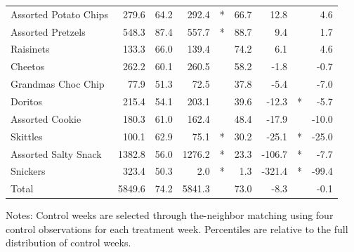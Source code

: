 \documentclass[aspectratio=169,11pt]{beamer}
\begin{document}
\begin{frame}
\begin{table}
\begin{center}
\begin{tabular}{|l|rrrcrrcr|}
Assorted Potato Chips&279.6&64.2&292.4&\hspace{-0.3in}*&66.7&12.8& \hspace{-0.3in}&4.6\\
Assorted Pretzels&548.3&87.4&557.7&\hspace{-0.3in}*&88.7&9.4& \hspace{-0.3in}&1.7\\
Raisinets&133.3&66.0&139.4& \hspace{-0.3in}&74.2&6.1& \hspace{-0.3in}&4.6\\
Cheetos&262.2&60.1&260.5& \hspace{-0.3in}&58.2&-1.8& \hspace{-0.3in}&-0.7\\
Grandmas Choc Chip&77.9&51.3&72.5& \hspace{-0.3in}&37.8&-5.4& \hspace{-0.3in}&-7.0\\
Doritos&215.4&54.1&203.1& \hspace{-0.3in}&39.6&-12.3& \hspace{-0.3in}*&-5.7\\
Assorted Cookie&180.3&61.0&162.4& \hspace{-0.3in}&48.4&-17.9& \hspace{-0.3in}&-10.0\\
Skittles&100.1&62.9&75.1&\hspace{-0.3in}*&30.2&-25.1& \hspace{-0.3in}*&-25.0\\
Assorted Salty Snack&1382.8&56.0&1276.2&\hspace{-0.3in}*&23.3&-106.7& \hspace{-0.3in}*&-7.7\\
Snickers&323.4&50.3&2.0&\hspace{-0.3in}*&1.3&-321.4& \hspace{-0.3in}*&-99.4\\ \hline
Total&5849.6&74.2&5841.3& \hspace{-0.3in}&73.0&-8.3& \hspace{-0.3in}&-0.1\\
\hline\end{tabular}
\end{center}
\tiny
Notes: Control weeks are selected through the-neighbor matching using four control observations for each treatment week.  Percentiles are relative to the full distribution of control weeks.
\end{table}
\end{frame}
\end{document}
